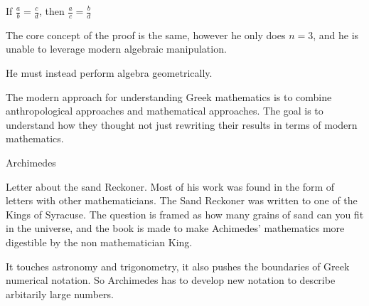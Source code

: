 \documentclass{report}
\begin{document}
\begin{description}
\begin{mdframed}
\begin{mdframed}
\begin{mdframed}
                    \begin{mdframed}
                        If $\frac{a}{b} = \frac{c}{d}$, then
                        $\frac{a}{c} = \frac{b}{d}$
                    \end{mdframed}
                \end{mdframed}

                The core concept of the proof is the same,
                however he only does $n = 3$, and he is
                unable to leverage modern algebraic manipulation.

                He must instead perform algebra geometrically.
            \end{mdframed}
            \begin{mdframed}
                The modern approach for understanding Greek
                mathematics is to combine anthropological approaches
                and mathematical approaches. The goal is to understand
                how they thought not just rewriting their results
                in terms of modern mathematics.
            \end{mdframed}
        \item {\large Archimedes}
            \begin{mdframed}
                Letter about the sand Reckoner. Most of his
                work was found in the form of letters with
                other mathematicians. The Sand Reckoner was
                written to one of the Kings of Syracuse.
                The question is framed as how many grains of
                sand can you fit in the universe, and the
                book is made to make Achimedes' mathematics
                more digestible by the non mathematician King.

                It touches astronomy and trigonometry, it also
                pushes the boundaries of Greek numerical notation.
                So Archimedes has to develop new notation to describe
                arbitarily large numbers.
            \end{mdframed}
        \end{mdframed}
\end{description}
\end{document}
